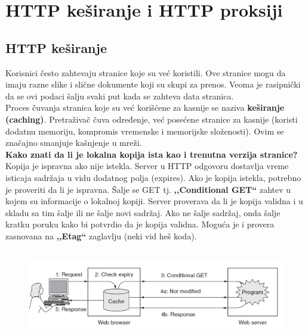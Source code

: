 \documentclass[a4paper]{article}
\begin{document}
\section{HTTP keširanje i HTTP proksiji}
    \subsection{HTTP keširanje}
        Korisnici često zahtevaju stranice koje su već koristili. Ove stranice mogu da imaju
        razne slike i slične dokumente koji su skupi za prenos. Veoma je rasipnički da se 
        ovi podaci šalju svaki put kada se zahteva data stranica. \\
        \indent Proces čuvanja stranica koje su već korišćene za kasnije se naziva \textbf{keširanje
        (caching)}. Pretraživač čuva određenje, već posećene stranice za kasnije (koristi dodatnu
        memoriju, kompromis vremenske i memorijske složenosti). Ovim se značajno 
        smanjuje kašnjenje u mreži. \\
        \indent \textbf{Kako znati da li je lokalna kopija ista kao i trenutna verzija stranice?}
        Kopija je ispravna ako nije istekla. Server u HTTP odgovoru dostavlja vreme isticaja sadržaja
        u vidu dodatnog polja (expires). Ako je kopija istekla, potrebno je proveriti 
        da li je ispravna. Šalje se GET tj. \textbf{,,Conditional GET``} 
        zahtev u kojem su informacije o lokalnoj kopiji. Server proverava da li je kopija validna 
        i u skladu sa tim šalje ili ne šalje novi sadržaj. Ako ne šalje sadržaj, onda šalje kratku
        poruku kako bi potvrdio da je kopija validna. Moguća je i provera zasnovana na 
        \textbf{,,Etag``} zaglavlju (neki vid heš koda).
        \begin{figure}[H]
            \begin{center}
                \includegraphics[width=120mm,height=40mm]{Slike/http8.png}
            \end{center}
        \end{figure}
    
\end{document}
